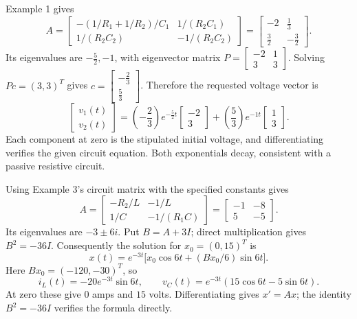 Example 1 gives
\[A=\begin{bmatrix}-(1/R_1+1/R_2)/C_1&1/(R_2C_1)\\
1/(R_2C_2)&-1/(R_2C_2)\end{bmatrix}=\left[\begin{matrix}-2 & \frac{1}{3}\\\frac{3}{2} & - \frac{3}{2}\end{matrix}\right].\]
Its eigenvalues are $- \frac{5}{2},-1$, with eigenvector
matrix $P=\left[\begin{matrix}-2 & 1\\3 & 3\end{matrix}\right]$. Solving $Pc=(3,3)^T$
gives $c=\left[\begin{matrix}- \frac{2}{3}\\\frac{5}{3}\end{matrix}\right]$. Therefore the requested voltage vector is
\[\begin{bmatrix}v_1(t)\\v_2(t)\end{bmatrix}=\left(- \frac{2}{3}\right)e^{- \frac{5}{2}t}\left[\begin{matrix}-2\\3\end{matrix}\right]+\left(\frac{5}{3}\right)e^{-1t}\left[\begin{matrix}1\\3\end{matrix}\right].\]
Each component at zero is the stipulated initial voltage, and differentiating
verifies the given circuit equation. Both exponentials decay, consistent
with a passive resistive circuit.

Using Example 3's circuit matrix with the specified constants gives
\[A=\begin{bmatrix}-R_2/L&-1/L\\1/C&-1/(R_1C)\end{bmatrix}
=\begin{bmatrix}-1&-8\\5&-5\end{bmatrix}.\]
Its eigenvalues are $-3\pm6i$. Put $B=A+3I$; direct multiplication
gives $B^2=-36I$. Consequently the solution for $x_0=(0,15)^T$ is
\[x(t)=e^{-3t}\bigl[x_0\cos6t+(Bx_0/6)\sin6t\bigr].\]
Here $Bx_0=(-120,-30)^T$, so
\[i_L(t)=-20e^{-3t}\sin6t,\qquad
v_C(t)=e^{-3t}(15\cos6t-5\sin6t).\]
At zero these give $0$ amps and $15$ volts. Differentiating gives
$x'=Ax$; the identity $B^2=-36I$ verifies the formula directly.

